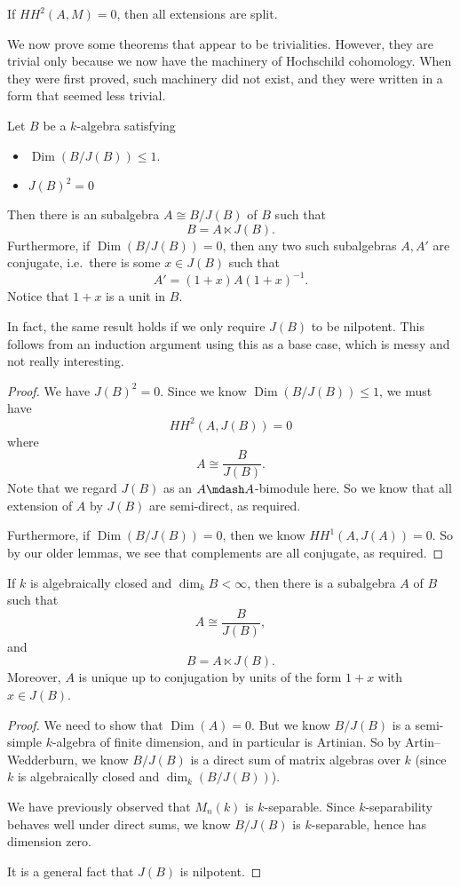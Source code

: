 \documentclass[a4paper]{article}
\DeclareMathOperator\Dim{Dim}
\newcommand\HH{H\!H}
\begin{document}
\begin{cor}
  If $\HH^2(A, M) = 0$, then all extensions are split.
\end{cor}

We now prove some theorems that appear to be trivialities. However, they are trivial only because we now have the machinery of Hochschild cohomology. When they were first proved, such machinery did not exist, and they were written in a form that seemed less trivial.
\begin{thm}
  Let $B$ be a $k$-algebra satisfying
  \begin{itemize}
    \item $\Dim (B/J(B)) \leq 1$.
    \item $J(B)^2 = 0$
  \end{itemize}
  Then there is an subalgebra $A \cong B/J(B)$ of $B$ such that
  \[
    B = A \ltimes J(B).
  \]
  Furthermore, if $\Dim (B/J(B)) = 0$, then any two such subalgebras $A, A'$ are conjugate, i.e.\ there is some $x \in J(B)$ such that
  \[
    A' = (1 + x) A (1 + x)^{-1}.
  \]
  Notice that $1 + x$ is a unit in $B$.
\end{thm}
In fact, the same result holds if we only require $J(B)$ to be nilpotent. This follows from an induction argument using this as a base case, which is messy and not really interesting.

\begin{proof}
  We have $J(B)^2 = 0$. Since we know $\Dim (B/J(B)) \leq 1$, we must have
  \[
    \HH^2(A, J(B)) = 0
  \]
  where
  \[
    A \cong \frac{B}{J(B)}.
  \]
  Note that we regard $J(B)$ as an $A\mdash A$-bimodule here. So we know that all extension of $A$ by $J(B)$ are semi-direct, as required.

  Furthermore, if $\Dim (B/J(B)) = 0$, then we know $\HH^1(A, J(A)) = 0$. So by our older lemmas, we see that complements are all conjugate, as required.
\end{proof}

\begin{cor}
  If $k$ is algebraically closed and $\dim_k B < \infty$, then there is a subalgebra $A$ of $B$ such that
  \[
    A \cong \frac{B}{J(B)},
  \]
  and
  \[
    B = A \ltimes J(B).
  \]
  Moreover, $A$ is unique up to conjugation by units of the form $1 + x$ with $x \in J(B)$.
\end{cor}

\begin{proof}
  We need to show that $\Dim (A) = 0$. But we know $B/J(B)$ is a semi-simple $k$-algebra of finite dimension, and in particular is Artinian. So by Artin--Wedderburn, we know $B/J(B)$ is a direct sum of matrix algebras over $k$ (since $k$ is algebraically closed and $\dim_k(B/J(B))$).

  We have previously observed that $M_n(k)$ is $k$-separable. Since $k$-separability behaves well under direct sums, we know $B/J(B)$ is $k$-separable, hence has dimension zero.

  It is a general fact that $J(B)$ is nilpotent.
\end{proof}
\end{document}

